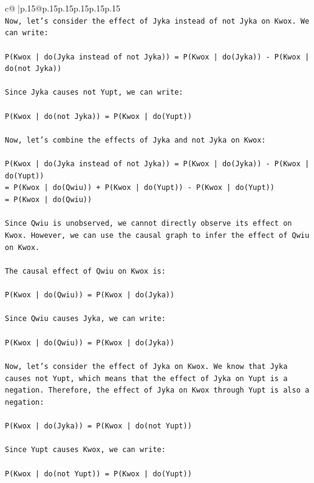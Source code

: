 \documentclass{article}
\begin{document}
{\begin{supertabular}{c@{$\;$}|p{.15\linewidth}@{}p{.15\linewidth}p{.15\linewidth}p{.15\linewidth}p{.15\linewidth}p{.15\linewidth}}
{{{\\ 
\texttt{Now, let's consider the effect of Jyka instead of not Jyka on Kwox. We can write:} \\
\\ 
\texttt{P(Kwox | do(Jyka instead of not Jyka)) = P(Kwox | do(Jyka)) {-} P(Kwox | do(not Jyka))} \\
\\ 
\texttt{Since Jyka causes not Yupt, we can write:} \\
\\ 
\texttt{P(Kwox | do(not Jyka)) = P(Kwox | do(Yupt))} \\
\\ 
\texttt{Now, let's combine the effects of Jyka and not Jyka on Kwox:} \\
\\ 
\texttt{P(Kwox | do(Jyka instead of not Jyka)) = P(Kwox | do(Jyka)) {-} P(Kwox | do(Yupt))} \\
\texttt{= P(Kwox | do(Qwiu)) + P(Kwox | do(Yupt)) {-} P(Kwox | do(Yupt))} \\
\texttt{= P(Kwox | do(Qwiu))} \\
\\ 
\texttt{Since Qwiu is unobserved, we cannot directly observe its effect on Kwox. However, we can use the causal graph to infer the effect of Qwiu on Kwox.} \\
\\ 
\texttt{The causal effect of Qwiu on Kwox is:} \\
\\ 
\texttt{P(Kwox | do(Qwiu)) = P(Kwox | do(Jyka))} \\
\\ 
\texttt{Since Qwiu causes Jyka, we can write:} \\
\\ 
\texttt{P(Kwox | do(Qwiu)) = P(Kwox | do(Jyka))} \\
\\ 
\texttt{Now, let's consider the effect of Jyka on Kwox. We know that Jyka causes not Yupt, which means that the effect of Jyka on Yupt is a negation. Therefore, the effect of Jyka on Kwox through Yupt is also a negation:} \\
\\ 
\texttt{P(Kwox | do(Jyka)) = P(Kwox | do(not Yupt))} \\
\\ 
\texttt{Since Yupt causes Kwox, we can write:} \\
\\ 
\texttt{P(Kwox | do(not Yupt)) = P(Kwox | do(Yupt))} \\
}}}
\end{supertabular}}
\end{document}
